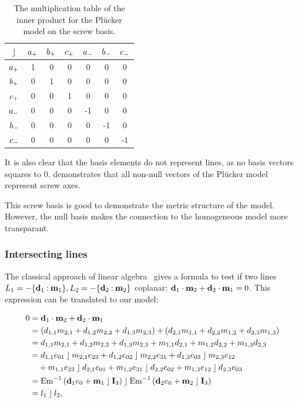 \begin{table}
  \caption{The multiplication table of the inner product for the Pl\"ucker model on the screw basis.}
  \label{tab:screwmetric}
  \begin{center}
    \begin{tabular}{|c||c|c|c|c|c|c|}
      \hline
      $\mathbin{\rfloor}$ & $a_{+}$ & $b_{+}$ & $c_{+}$ & $a_{-}$ & $b_{-}$ & $c_{-}$ \\
      \hline \hline
      $a_{+}$ & 1 & 0 & 0 & 0 & 0 & 0 \\
      \hline
      $b_{+}$ & 0 & 1 & 0 & 0 & 0 & 0 \\
      \hline
      $c_{+}$ & 0 & 0 & 1 & 0 & 0 & 0 \\
      \hline
      $a_{-}$ & 0 & 0 & 0 & -1 & 0 & 0 \\
      \hline
      $b_{-}$ & 0 & 0 & 0 & 0 & -1 & 0 \\
      \hline
      $c_{-}$ & 0 & 0 & 0 & 0 & 0 & -1 \\
      \hline
    \end{tabular}
  \end{center}
\end{table}

It is also clear that the basis elements do not represent lines, as no basis vectors squares to $0$.   demonstrates that all non-null vectors of the Pl\"ucker model represent screw axes.  

This screw basis is good to demonstrate the metric structure of the model.  However, the null basis makes the connection to the homogeneous model more transparant.  

\subsubsection{Intersecting lines}
The classical approach of linear algebra~\cite{Shoemake} gives a formula to test if two lines $L_1 = -\{\mathbf{d}_1 \mathbin{:} \mathbf{m}_1\}, L_2 = -\{\mathbf{d}_2 \mathbin{:} \mathbf{m}_2\}$ coplanar: $\mathbf{d}_1 \mathbin{\cdot} \mathbf{m}_2 + \mathbf{d}_2 \mathbin{\cdot} \mathbf{m}_1 = 0$.  This expression can be translated to our model:

\begin{align*}
  0 &= \mathbf{d}_1 \mathbin{\cdot} \mathbf{m}_2 + \mathbf{d}_2 \mathbin{\cdot} \mathbf{m}_1 \\
    &= \left( d_{1,1} m_{2,1} + d_{1,2} m_{2,2} + d_{1,3} m_{2,3} \right) + \left( d_{2,1} m_{1,1} + d_{2,2} m_{1,2} + d_{2,3} m_{1,3} \right) \\
    &= d_{1,1} m_{2,1} + d_{1,2} m_{2,2} + d_{1,3} m_{2,3} + m_{1,1} d_{2,1} + m_{1,2} d_{2,2} + m_{1,3} d_{2,3} \\
    &= d_{1,1} e_{01} \mathbin{\rfloor} m_{2,1} e_{23} + d_{1,2} e_{02} \mathbin{\rfloor} m_{2,2} e_{31} + d_{1,3} e_{03} \mathbin{\rfloor} m_{2,3} e_{12} \\
    &\quad + m_{1,1} e_{23} \mathbin{\rfloor} d_{2,1} e_{01} + m_{1,2} e_{31} \mathbin{\rfloor} d_{2,2} e_{02} + m_{1,3} e_{12} \mathbin{\rfloor} d_{2,3} e_{03} \\
    &= \operatorname{Em}^{-1}\left( \mathbf{d}_1e_0 + \mathbf{m}_1 \mathbin{\rfloor} \mathbf{I}_3 \right) \mathbin{\rfloor} \operatorname{Em}^{-1}\left( \mathbf{d}_2e_0 + \mathbf{m}_2 \mathbin{\rfloor} \mathbf{I}_3 \right) \\
    &= l_1 \mathbin{\rfloor} l_2,
\end{align*}


